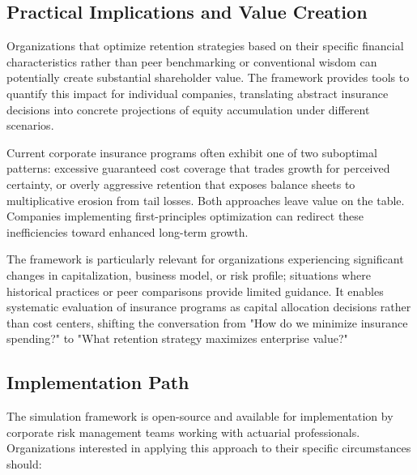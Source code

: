 \documentclass[11pt,letterpaper]{article}
\begin{document}
\subsection{Practical Implications and Value Creation}

Organizations that optimize retention strategies based on their specific financial characteristics rather than peer benchmarking or conventional wisdom can potentially create substantial shareholder value. The framework provides tools to quantify this impact for individual companies, translating abstract insurance decisions into concrete projections of equity accumulation under different scenarios.

Current corporate insurance programs often exhibit one of two suboptimal patterns: excessive guaranteed cost coverage that trades growth for perceived certainty, or overly aggressive retention that exposes balance sheets to multiplicative erosion from tail losses. Both approaches leave value on the table. Companies implementing first-principles optimization can redirect these inefficiencies toward enhanced long-term growth.

The framework is particularly relevant for organizations experiencing significant changes in capitalization, business model, or risk profile; situations where historical practices or peer comparisons provide limited guidance. It enables systematic evaluation of insurance programs as capital allocation decisions rather than cost centers, shifting the conversation from "How do we minimize insurance spending?" to "What retention strategy maximizes enterprise value?"

\subsection{Implementation Path}

The simulation framework is open-source and available for implementation by corporate risk management teams working with actuarial professionals. Organizations interested in applying this approach to their specific circumstances should:
\end{document}
